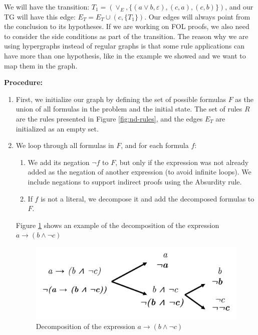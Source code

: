 \documentclass[runningheads]{llncs}
\begin{document}
We will have the transition: \(T_1 = (\vee_E, \{(a \vee b, \varepsilon), (c, a), (c, b)\})\), and our TG will have this edge: \(E_T = E_T \cup (c, \{T_1\})\). Our edges will always point from the conclusion to its hypotheses. If we are working on FOL proofs, we also need to consider the side conditions as part of the transition. The reason why we are using hypergraphs instead of regular graphs is that some rule applications can have more than one hypothesis, like in the example we showed and we want to map them in the graph.

\vspace{1em}
\textbf{Procedure: }

\begin{enumerate}
    \item First, we initialize our graph by defining the set of possible formulas \(F\) as the union of all formulas in the problem and the initial state. The set of rules \(R\) are the rules presented in Figure \ref{fig:nd-rules}, and the edges \(E_T\) are initialized as an empty set.

    \item We loop through all formulas in \(F\), and for each formula \(f\):

    \begin{enumerate}
         \item We add its negation \(\lnot f\) to \(F\), but only if the expression was not already added as the negation of another expression (to avoid infinite loops). We include negations to support indirect proofs using the Absurdity rule.
         \item If \(f\) is not a literal, we decompose it and add the decomposed formulas to \(F\).
    \end{enumerate}

    Figure \ref{fig:tg-exps} shows an example of the decomposition of the expression \(a \to ( b \land \lnot c)\) 
    \begin{figure}
        \centering
        \includegraphics[width=0.6\linewidth]{resources/decomposition.jpg}
        \caption{Decomposition of the expression \(a \to ( b \land \lnot c)\)}
        \label{fig:tg-exps}
    \end{figure}


\end{enumerate}
\end{document}
